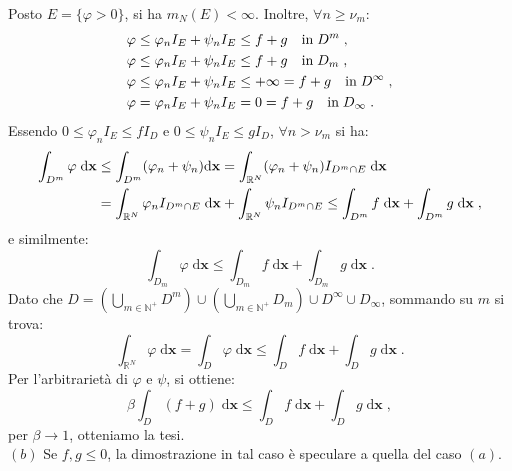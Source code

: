 \documentclass[a4paper,12pt]{report}
\theoremstyle{plain}
\theoremstyle{definition}
\theoremstyle{remark}
\newcommand{\diff}[1]{\mathrm{d}#1}
\numberwithin{equation}{section}
\begin{document}
Posto $E=\{\varphi>0\}$, si ha $m_N(E)<\infty$. Inoltre, $\forall n\ge \nu_m$:
\begin{align}
&\varphi\le \varphi_nI_E+\psi_nI_E\le f+g\quad \mbox{in}\; D^m\;, \notag \\
&\varphi\le \varphi_nI_E+\psi_nI_E\le f+g\quad \mbox{in}\; D_m\;, \notag \\
&\varphi\le \varphi_nI_E+\psi_nI_E\le +\infty=f+g\quad \mbox{in}\; D^{\infty}\;, \notag \\
&\varphi=\varphi_nI_E+\psi_nI_E=0=f+g\quad \mbox{in}\; D_{\infty}\;.
\end{align}
Essendo $0\le \varphi_nI_E\le fI_D$ e $0\le \psi_nI_E\le gI_D$, $\forall n>\nu_m$ si ha:
\begin{align}
\int_{D^m}\varphi\;\diff{\mathbf{x}} &\le \int_{D^m}(\varphi_n+\psi_n)\diff{\mathbf{x}}=\int_{\mathbb{R}^N}(\varphi_n+\psi_n)I_{D^m\cap E}\;\diff{\mathbf{x}} \notag \\
&=\int_{\mathbb{R}^N}\varphi_nI_{D^m\cap E}\;\diff{\mathbf{x}}+\int_{\mathbb{R}^N}\psi_nI_{D^m\cap E}\le \int_{D^m}f\;\diff{\mathbf{x}}+\int_{D^m}g\;\diff{\mathbf{x}}\;,
\end{align}
e similmente:
\begin{equation}
\int_{D_m} \varphi\;\diff{\mathbf{x}}\le \int_{D_m}f\;\diff{\mathbf{x}}+\int_{D_m}g\;\diff{\mathbf{x}}\;.
\end{equation}
Dato che $D=\left(\bigcup_{m\in\mathbb{N}^+} D^m\right)\cup \left(\bigcup_{m\in\mathbb{N}^+}D_m\right)\cup D^{\infty}\cup D_{\infty}$, sommando su $m$ si trova:
\begin{equation}
\int_{\mathbb{R}^N} \varphi\;\diff{\mathbf{x}}=\int_D \varphi\;\diff{\mathbf{x}}\le \int_D f\;\diff{\mathbf{x}}+\int_D g\;\diff{\mathbf{x}}\;.
\end{equation}
Per l'arbitrarietà di $\varphi$ e $\psi$, si ottiene:
\begin{equation}
\beta\int_D (f+g)\;\diff{\mathbf{x}} \le \int_D f\;\diff{\mathbf{x}}+\int_D g\;\diff{\mathbf{x}}\;,
\end{equation}
per $\beta \to 1$, otteniamo la tesi. \\

$(b)$ Se $f,g \le 0$, la dimostrazione in tal caso è speculare a quella del caso $(a)$. \\
\end{document}
